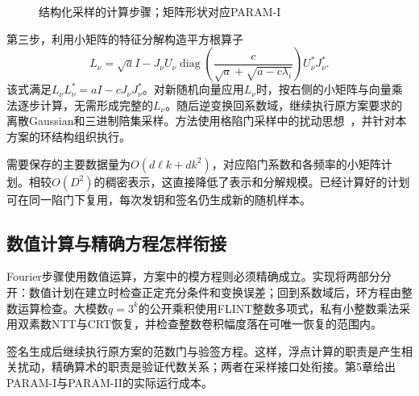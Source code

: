\begin{figure}[H]
\centering
{}
\caption{结构化采样的计算步骤；矩阵形状对应PARAM-I}
\label{fig:ring-sampler}
\end{figure}

第三步，利用小矩阵的特征分解构造平方根算子
\[
 L_\nu=\sqrt a I-
 J_\nu U_\nu\operatorname{diag}\!\left(
 \frac{c}{\sqrt a+\sqrt{a-c\lambda_i}}
 \right)U_\nu^*J_\nu^*.
\]
该式满足$L_\nu L_\nu^*=aI-cJ_\nu J_\nu^*$。对新随机向量应用$L_\nu$时，按右侧的小矩阵与向量乘法逐步计算，无需形成完整的$L_\nu$。随后逆变换回系数域，继续执行原方案要求的离散Gaussian和三进制陪集采样。方法使用格陷门采样中的扰动思想~\cite{micciancio2012trapdoors}，并针对本方案的环结构组织执行。

需要保存的主要数据量为$O(d\ell k+dk^2)$，对应陷门系数和各频率的小矩阵计划。相较$O(D^2)$的稠密表示，这直接降低了表示和分解规模。已经计算好的计划可在同一陷门下复用，每次发钥和签名仍生成新的随机样本。

\subsection{数值计算与精确方程怎样衔接}
Fourier步骤使用数值运算，方案中的模方程则必须精确成立。实现将两部分分开：数值计划在建立时检查正定充分条件和变换误差；回到系数域后，环方程由整数运算检查。大模数$q=3^k$的公开乘积使用FLINT整数多项式，私有小整数乘法采用双素数NTT与CRT恢复，并检查整数卷积幅度落在可唯一恢复的范围内。

签名生成后继续执行原方案的范数门与验签方程。这样，浮点计算的职责是产生相关扰动，精确算术的职责是验证代数关系；两者在采样接口处衔接。第5章给出PARAM-I与PARAM-II的实际运行成本。

